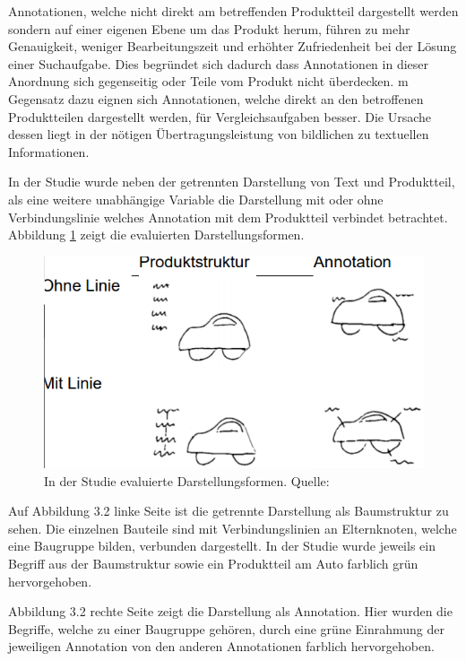 Annotationen, welche nicht direkt am betreffenden Produktteil dargestellt werden sondern auf einer eigenen Ebene um das Produkt herum, führen zu mehr Genauigkeit, weniger Bearbeitungszeit und erhöhter Zufriedenheit bei der Lösung einer Suchaufgabe. Dies begründet sich dadurch dass Annotationen in dieser Anordnung sich gegenseitig oder Teile vom Produkt nicht überdecken. m Gegensatz dazu eignen sich Annotationen, welche direkt an den betroffenen Produktteilen dargestellt werden, für Vergleichsaufgaben besser. Die Ursache dessen liegt in der nötigen Übertragungsleistung von bildlichen zu textuellen Informationen. \cite[S.~52]{Brandenburg2019} 

In der Studie wurde neben der getrennten Darstellung von Text und Produktteil, als eine weitere unabhängige
Variable die Darstellung mit oder ohne Verbindungslinie welches Annotation mit dem Produktteil
verbindet betrachtet. Abbildung \ref{img:uv} zeigt die evaluierten Darstellungsformen.

\begin{figure}[H]
	\centering 
	\includegraphics[width=.6\textwidth]{resources/analyse/brandenburg_uv.png}
	\caption{In der Studie evaluierte Darstellungsformen. Quelle: \cite[S.~127]{Brandenburg2019}}
	\label{img:uv}
\end{figure}

Auf Abbildung 3.2 linke Seite ist die getrennte Darstellung als Baumstruktur zu sehen. Die einzelnen Bauteile sind mit Verbindungslinien an Elternknoten, welche eine Baugruppe bilden, verbunden dargestellt. In der Studie wurde jeweils ein Begriff aus der Baumstruktur sowie ein Produktteil am Auto farblich grün hervorgehoben. 

Abbildung 3.2 rechte Seite zeigt die Darstellung als Annotation. Hier wurden die Begriffe, welche zu einer Baugruppe gehören, durch eine grüne Einrahmung der jeweiligen Annotation von den anderen 
Annotationen farblich hervorgehoben.  

